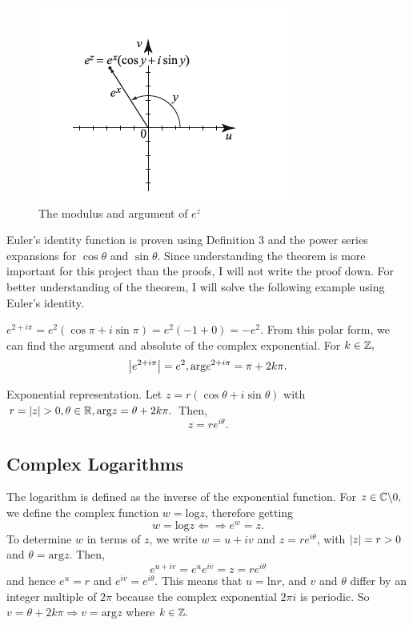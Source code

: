 \documentclass[11pt,reqno,oneside,a4paper]{article}
\begin{document}
\begin{figure}
    \centering
    \includegraphics[width=0.8\linewidth]{gfx/complex exp vis.png}
    \caption{The modulus and argument of $e^z$}
    \label{fig:complex exp vis}
\end{figure}


Euler's identity function is proven using Definition 3 and the power series expansions for $\cos\theta$ and $\sin\theta.$ 
Since understanding the theorem is more important for this project than the proofs, I will not write the proof down. 
For better understanding of the theorem, I will solve the following example using Euler's identity.

\begin{eg}
$e^{2+i\pi} =  e^2(\cos\pi + i\sin\pi) =e^2(-1+0) = -e^2.$ 
From this polar form, we can find the argument and absolute of the complex exponential. For $k\in\mathbb Z,$
$$\left\lvert e^{2+i\pi}\right\rvert = e^2, \text{arg}e^{2+i\pi} = \pi + 2k\pi.$$
\end{eg}

\begin{prop}{Exponential representation.}
Let $z = r(\cos\theta + i\sin\theta)$ with $r=\left\lvert z\right\rvert > 0, \theta \in \mathbb R, \text{arg}z = \theta+2k\pi.$ 
Then, $$z = re^{i\theta}.$$
\end{prop}




\subsection{Complex Logarithms}
The logarithm is defined as the inverse of the exponential function. 
For $z\in \mathbb C \backslash {0},$ we define the complex function $w=\text{log} z$, therefore getting $$w=\text{log}z \Leftarrow \Rightarrow e^w = z.$$
To determine $w$ in terms of $z$, we write $w=u+iv$ and $z=re^{i\theta}$, with $\left\lvert z\right\rvert = r > 0$ and $ \theta = \text{arg}z.$ 
Then, $$e^{u+iv} = e^ue^{iv} = z = re^{i\theta}$$ and hence $e^u = r $ and $e^{iv} = e^{i\theta}.$
This means that $u = \text{ln}r$, and $v$ and $\theta$ differ by an integer multiple of $2\pi$ because the complex exponential $2\pi i$ is periodic. 
So $v = \theta + 2k\pi \Rightarrow v = \text{arg}z$ where $k\in\mathbb Z.$
\end{document}
